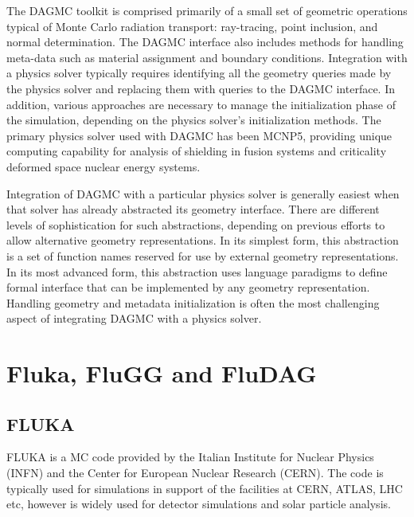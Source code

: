 \documentclass{anstrans}
\begin{document}
The DAGMC toolkit is comprised primarily of a small set of geometric
operations typical of Monte Carlo radiation transport: ray-tracing,
point inclusion, and normal determination.  The DAGMC interface also
includes methods for handling meta-data such as material assignment
and boundary conditions.  Integration with a physics solver typically
requires identifying all the geometry queries made by the physics
solver and replacing them with queries to the DAGMC interface.  In
addition, various approaches are necessary to manage the
initialization phase of the simulation, depending on the physics
solver's initialization methods.  The primary physics solver used with
DAGMC has been MCNP5, providing unique computing capability for
analysis of shielding in fusion systems\cite{fusion3d} and criticality
deformed space nuclear energy systems\cite{nets}.

Integration of DAGMC with a particular physics solver is generally
easiest when that solver has already abstracted its geometry
interface.  There are different levels of sophistication for such
abstractions, depending on previous efforts to allow alternative
geometry representations.  In its simplest form, this abstraction is a
set of function names reserved for use by external geometry
representations.  In its most advanced form, this abstraction uses
language paradigms to define formal interface that can be implemented
by any geometry representation.  Handling geometry and metadata
initialization is often the most challenging aspect of integrating
DAGMC with a physics solver.

\section{Fluka, FluGG and FluDAG}

\subsection{FLUKA}
FLUKA\cite{fluka} is a MC code provided by the Italian Institute for Nuclear
Physics (INFN) and the Center for European Nuclear Research (CERN). The
code is typically used for simulations in support of the facilities at   
CERN, ATLAS, LHC etc, however is widely used for detector simulations and 
solar particle analysis. 
\end{document}
